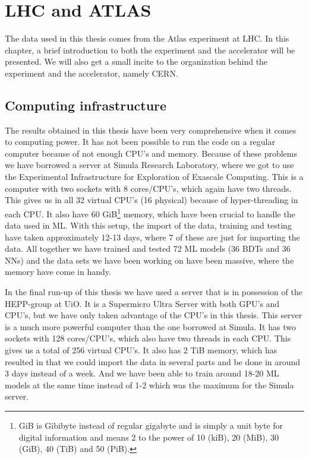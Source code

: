 \chapter{LHC and ATLAS}
\label{sec:LHCandATLAS}
The data used in this thesis comes from the Atlas experiment at LHC. In this chapter,  a brief introduction to both the experiment and the accelerator will be presented. We will also get a small incite to the organization behind the experiment and the accelerator, namely CERN. 









\section{Computing infrastructure}
The results obtained in this thesis have been very comprehensive when it comes to computing power. It has not been possible to run the code on a regular computer because of not enough CPU's and memory. Because of these problems we have borrowed a server at Simula Research Laboratory, where we got to use the Experimental Infrastructure for Exploration of Exascale Computing. This is a computer with two sockets with 8 cores/CPU's, which again have two threads. This gives us in all 32 virtual CPU's (16 physical) because of hyper-threading in each CPU. It also have 60 GiB\footnote{GiB is Gibibyte instead of regular gigabyte and is simply a unit byte for digital information and means 2 to the power of 10 (kiB), 20 (MiB), 30 (GiB), 40 (TiB) and 50 (PiB).} memory, which have been crucial to handle the data used in ML. With this setup, the import of the data, training and testing have taken approximately 12-13 days, where 7 of these are just for importing the data. All together we have trained and tested 72 ML models (36 BDTs and 36 NNs) and the data sets we have been working on have been massive, where the memory have come in handy. 

In the final run-up of this thesis we have used a server that is in possession of the HEPP-group at UiO. It is a Supermicro Ultra Server with both GPU's and CPU's, but we have only taken advantage of the CPU's in this thesis. This server is a much more powerful computer than the one borrowed at Simula. It has two sockets with 128 cores/CPU's, which also have two threads in each CPU. This gives us a total of 256 virtual CPU's. It also has 2 TiB memory, which has resulted in that we could import the data in several parts and be done in around 3 days instead of a week. And we have been able to train around 18-20 ML models at the same time instead of 1-2 which was the maximum for the Simula server. 